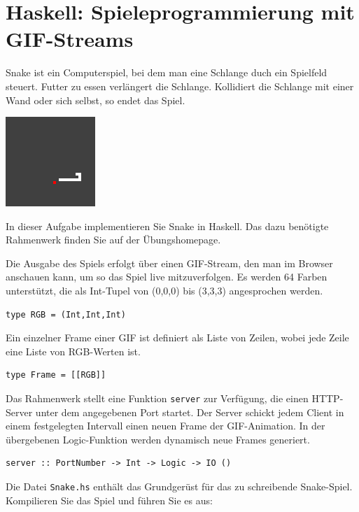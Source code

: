 \documentclass{scrartcl}
\begin{document}
\section{Haskell: Spieleprogrammierung mit GIF-Streams}

Snake ist ein Computerspiel, bei dem man eine Schlange duch ein Spielfeld steuert.
Futter zu essen verlängert die Schlange.
Kollidiert die Schlange mit einer Wand oder sich selbst, so endet das Spiel.

\begin{center}
\includegraphics{snake}
\end{center}

In dieser Aufgabe implementieren Sie Snake in Haskell.
Das dazu benötigte Rahmenwerk finden Sie auf der Übungshomepage.

Die Ausgabe des Spiels erfolgt über einen GIF-Stream, den man im Browser anschauen kann, um so das Spiel live mitzuverfolgen.
Es werden 64 Farben unterstützt, die als Int-Tupel von (0,0,0) bis (3,3,3) angesprochen werden.

\begin{lstlisting}
type RGB = (Int,Int,Int)
\end{lstlisting}

Ein einzelner Frame einer GIF ist definiert als Liste von Zeilen, wobei jede Zeile eine Liste von RGB-Werten ist.

\begin{lstlisting}
type Frame = [[RGB]]
\end{lstlisting}

Das Rahmenwerk stellt eine Funktion \texttt{server} zur Verfügung, die einen HTTP-Server unter dem angegebenen Port startet.
Der Server schickt jedem Client in einem festgelegten Intervall einen neuen Frame der GIF-Animation.
In der übergebenen Logic-Funktion werden dynamisch neue Frames generiert.

\begin{lstlisting}
server :: PortNumber -> Int -> Logic -> IO ()
\end{lstlisting}

Die Datei \texttt{Snake.hs} enthält das Grundgerüst für das zu schreibende Snake-Spiel.
Kompilieren Sie das Spiel und führen Sie es aus:
\end{document}
